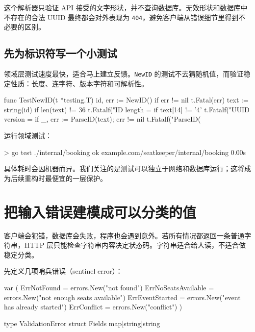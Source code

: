 这个解析器只验证 API 接受的文字形状，并不查询数据库。无效形状和数据库中不存在的合法 UUID 最终都会对外表现为 \texttt{404}，避免客户端从错误细节里得到不必要的区别。

\subsection{先为标识符写一个小测试}

领域层测试速度最快，适合马上建立反馈。\texttt{NewID} 的测试不去猜随机值，而验证稳定性质：长度、连字符、版本字符和可解析性。

\begin{gocode}[title={代码清单 12.11 \texttt{id\_test.go}：验证 ID 的性质}]
func TestNewID(t *testing.T) {
    id, err := NewID()
    if err != nil {
        t.Fatal(err)
    }
    text := string(id)
    if len(text) != 36 {
        t.Fatalf("ID length = %
    }
    if text[14] != '4' {
        t.Fatalf("UUID version = %
    }
    if _, err := ParseID(text); err != nil {
        t.Fatalf("ParseID(%
    }
}
\end{gocode}

运行领域测试：

\begin{shellcode}[]
> go test ./internal/booking
ok      example.com/seatkeeper/internal/booking   0.00s
\end{shellcode}
\color{PocketInk}

具体耗时会因机器而异。我们关注的是测试可以独立于网络和数据库运行；这将成为后续重构时最便宜的一层保护。

\section{把输入错误建模成可以分类的值}

客户端会犯错，数据库会失败，程序也会遇到意外。若所有情况都返回一条普通字符串，HTTP 层只能检查字符串内容决定状态码。字符串适合给人读，不适合做稳定分类。

先定义几项哨兵错误（sentinel error）：

\begin{gocode}[title={代码清单 12.12 \texttt{errors.go}：领域错误}]
var (
    ErrNotFound         = errors.New("not found")
    ErrNoSeatsAvailable = errors.New("not enough seats available")
    ErrEventStarted     = errors.New("event has already started")
    ErrConflict         = errors.New("conflict")
)

type ValidationError struct {
    Fields map[string]string
}
\end{gocode}

